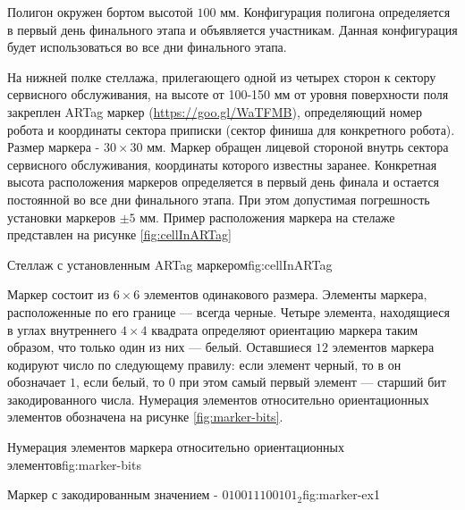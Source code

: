 Полигон окружен бортом высотой $100$ мм.
Конфигурация полигона определяется в первый день финального этапа и объявляется участникам.
Данная конфигурация будет использоваться во все дни финального этапа.

На нижней полке стеллажа, прилегающего одной из четырех сторон к сектору сервисного обслуживания,
на высоте от 100-150 мм от уровня поверхности поля закреплен ARTag маркер (\url{https://goo.gl/WaTFMB}),
определяющий номер робота и координаты сектора приписки (сектор финиша для конкретного робота).
Размер маркера - $30\times30$ мм.
Маркер обращен лицевой стороной внутрь сектора сервисного обслуживания, координаты которого известны заранее.
Конкретная высота расположения маркеров определяется в первый день финала и остается
постоянной во все дни финального этапа. При этом допустимая погрешность установки
маркеров $\pm 5$ мм. Пример расположения маркера на стелаже представлен на рисунке \ref{fig:cellInARTag}

{Стеллаж с установленным ARTag маркером}{fig:cellInARTag}

Маркер состоит из $6\times6$ элементов одинакового размера.
Элементы маркера, расположенные по его границе --- всегда черные. Четыре элемента,
находящиеся в углах внутреннего $4\times 4$ квадрата определяют ориентацию маркера таким
образом, что только один из них --- белый.
Оставшиеся $12$ элементов маркера кодируют число по следующему правилу: если элемент черный, то в он обозначает $1$, если белый,
то $0$ при этом самый первый элемент --- старший бит закодированного числа.
Нумерация элементов относительно ориентационных элементов обозначена на рисунке \ref{fig:marker-bits}.

{Нумерация элементов маркера относительно ориентационных элементов}{fig:marker-bits}


{Маркер с закодированным значением - $010011100101_2$}{fig:marker-ex1}


